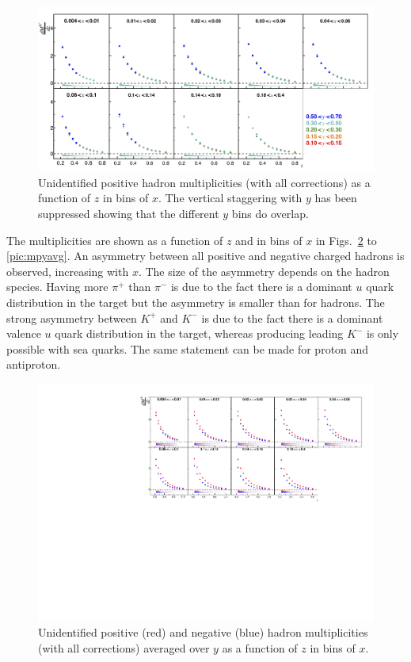 \begin{figure}[!h]
  \centering
	\includegraphics[scale=0.85]{./gfx/hnoystag.png}
	\caption{Unidentified positive hadron multiplicities (with all corrections) as a function of $z$ in bins of $x$. The vertical staggering with $y$ has been suppressed showing that the different $y$ bins do overlap.}
	\label{pic:mhnoy}
\end{figure}

The multiplicities are shown as a function of $z$ and in bins of $x$ in Figs.~\ref{pic:mhyavg} to \ref{pic:mpyavg}. An asymmetry between all positive and negative charged hadrons is observed, increasing with $x$. The size of the asymmetry depends on the hadron species. Having more $\pi^+$ than $\pi^-$ is due to the fact there is a dominant $u$ quark distribution in the target but the asymmetry is smaller than for hadrons. The strong asymmetry between $K^+$ and $K^-$ is due to the fact there is a dominant valence $u$ quark distribution in the target, whereas producing leading  $K^-$ is only possible with sea quarks. The same statement can be made for proton and antiproton.

\begin{figure}[!h]
  \centering
	\includegraphics[scale=0.85]{./gfx/hyavg.pdf}
	\caption{Unidentified positive (red) and negative (blue) hadron multiplicities (with all corrections) averaged over $y$ as a function of $z$ in bins of $x$.}
	\label{pic:mhyavg}
\end{figure}

